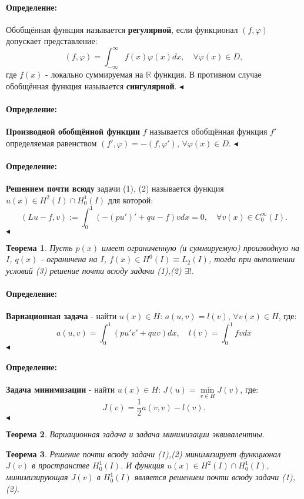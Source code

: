 \documentclass{article}
\newtheorem{theorem}{Теорема}
\newenvironment{definition}{ \paragraph{Определение:}}{\hfill $\blacktriangleleft$}
\begin{document}
\begin{definition}
	Обобщённая функция называется \textbf{регулярной}, если функционал $(f,\varphi)$ допускает представление:
	\[
	(f,\varphi) = 	\int_{-\infty}^{\infty} f(x) \varphi(x) dx, \quad \forall \varphi (x) \in D,
	\]
	где $f(x)$ - локально суммируемая на $\mathbb{R}$ функция. В противном случае обобщённая функция называется \textbf{сингулярной}.
\end{definition}

\begin{definition}
	\textbf{Производной обобщённой функции} $f$ называется обобщённая функция $f'$ определяемая равенством $(f',\varphi) = - (f, \varphi')$, $\forall \varphi (x) \in D$.
\end{definition}

\begin{definition}
	\textbf{Решением почти всюду} задачи (1), (2) называется функция $u(x)\in H^2(I) \cap H_0^1(I)$ для которой:
	\[
	(Lu - f, v) := \int_0^1 (-(p u')' + qu -f) v dx = 0, \quad \forall v(x) \in C_0^{\infty}(I).
	\] 
\end{definition}

\begin{theorem}
	Пусть $p(x)$ имеет ограниченную (и суммируемую) производную на $I$, $q(x)$ - ограничена на $I$, $f(x) \in H^0(I) \equiv L_2(I)$, тогда при выполнении условий (3) решение почти всюду задачи (1),(2) $\exists !$.
\end{theorem}

\begin{definition}
	\textbf{Вариационная задача} - найти $u(x) \in H$: $a(u,v) = l(v)$, $\forall v(x) \in H$, где:
	\[
	a(u,v) = \int_0^1 (pu'v' + q uv )dx, \quad l(v) = \int_0^1 f v dx
	\]
\end{definition}

\begin{definition}
	\textbf{Задача минимизации} - найти $u(x) \in H$: $J(u) = \min\limits_{v \in H} J(v)$, где:
	\[
	J(v) = \dfrac{1}{2} a(v,v) - l(v).
	\]
\end{definition}

\begin{theorem}
	Вариационная задача и задача минимизации эквивалентны.
\end{theorem}

\begin{theorem}
	Решение почти всюду задачи (1),(2) минимизирует функционал $J(v)$ в пространстве $H_0^1(I)$. И функция $u(x) \in H^2(I) \cap H_0^1(I)$, минимизирующая $J(v)$ в $H_0^1(I)$ является решением почти всюду задачи (1),(2).
\end{theorem}
\end{document}
